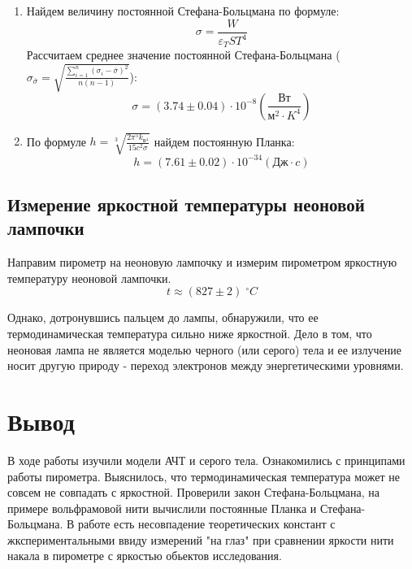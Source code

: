 \documentclass[a4paper]{article}
\begin{document}
\begin{enumerate}
    \item Найдем величину постоянной Стефана-Больцмана по формуле:
    $$\sigma = \frac{W}{\varepsilon_T S T^4}$$
    Рассчитаем среднее значение постоянной Стефана-Больцмана ($\sigma_{\overline\sigma} = \sqrt{\frac{\sum\limits_{i=1}^n(\sigma_i - \overline\sigma)^2}{n(n-1)}}$):
    $$\sigma = (3.74 \pm 0.04 )\cdot 10^{-8} \left ( \frac{\text{Вт}}{м^2\cdot K^4} \right )$$

    \item По формуле $h = \sqrt[3]{\frac{2 \pi^5 k_{\text{Б}^4}}{15 c^2 \sigma}}$ найдем постоянную Планка:
    $$h = (7.61 \pm 0.02) \cdot 10^{-34} (\text{Дж} \cdot c)$$

\end{enumerate}


\subsection{Измерение яркостной температуры неоновой лампочки}

Направим пирометр на неоновую лампочку и измерим пирометром яркостную температуру неоновой лампочки.
$$t \approx (827 \pm 2) \; ^{\circ}C$$

Однако, дотронувшись пальцем до лампы, обнаружили, что ее термодинамическая температура сильно ниже яркостной.
Дело в том, что неоновая лампа не является моделью черного (или серого) тела и ее излучение носит другую природу - 
переход электронов между энергетическими уровнями. 



\section{Вывод}

В ходе работы изучили модели АЧТ и серого тела. Ознакомились с принципами работы пирометра. Выяснилось, что термодинамическая
температура может не совсем не совпадать с яркостной. Проверили закон Стефана-Больцмана, на примере вольфрамовой нити вычислили
постоянные Планка и Стефана-Больцмана. В работе есть несовпадение теоретических констант с жкспериментальными ввиду измерений "на глаз"
при сравнении яркости нити накала в пирометре с яркостью обьектов исследования.
\end{document}
